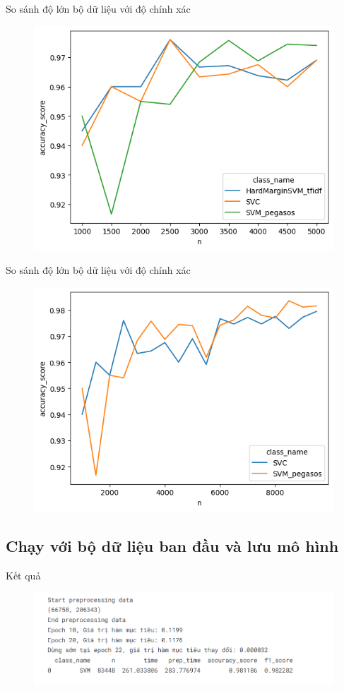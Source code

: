 \documentclass[serif, aspectratio=169]{beamer}
\begin{document}
	\begin{frame}{So sánh độ lớn bộ dữ liệu với độ chính xác}
		\begin{figure}
			\centering
			\includegraphics[width=0.6\linewidth]{pic/hardmargin-vs-pegasos-n-vs-acc.png}
			\label{fig:hardmargin-vs-pegasos-n-vs-acc}
		\end{figure}
	\end{frame}
	\begin{frame}{So sánh độ lớn bộ dữ liệu với độ chính xác}
		\begin{figure}
			\centering
			\includegraphics[width=0.6\linewidth]{pic/pegasos-vs-svc-n-acc.png}
			\label{fig:pegasos-vs-svc-n-acc}
		\end{figure}
	\end{frame}
	\subsection{Chạy với bộ dữ liệu ban đầu và lưu mô hình}
	\begin{frame}{Kết quả}
		\begin{figure}
			\centering
			\includegraphics[width=1\linewidth]{pic/svm-pegasos-result-full.png}
			\label{fig:svm-pegasos-result-full}
		\end{figure}
	\end{frame}
	
\end{document}
